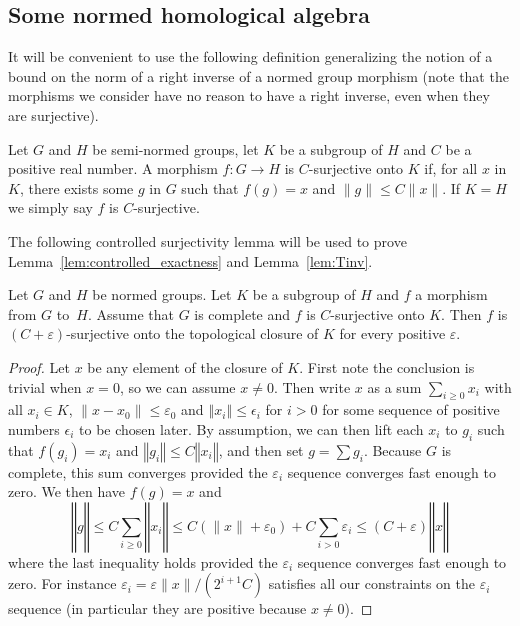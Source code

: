 \subsection{Some normed homological algebra}%
\label{sec:some_normed_homological_algebra}

It will be convenient to use the following definition generalizing the notion
of a bound on the norm of a right inverse of a normed group morphism (note that
the morphisms we consider have no reason to have a right inverse, even when
they are surjective).

\begin{definition}
  \label{def:surjective_with_bound}
  \leanok
  Let $G$ and $H$ be semi-normed groups, let $K$ be a subgroup of $H$ and $C$ be
  a positive real number.
  A morphism $f : G → H$ is $C$-surjective onto $K$ if, for all $x$ in $K$,
  there exists some $g$ in $G$ such that $f(g) = x$ and $\|g\| ≤ C\|x\|$.
  If $K = H$ we simply say $f$ is $C$-surjective.
\end{definition}

The following controlled surjectivity lemma will be used to prove
Lemma~\ref{lem:controlled_exactness} and Lemma~\ref{lem:Tinv}.

\begin{lemma}
  \label{lem:closure_surjective}
  \leanok
  Let $G$ and $H$ be normed groups.
  Let $K$ be a subgroup of $H$ and $f$ a morphism from $G$ to~$H$.
  Assume that $G$ is complete and $f$ is $C$-surjective onto $K$.
  Then $f$ is $(C + ε)$-surjective onto
  the topological closure of $K$ for every positive $ε$.
\end{lemma}

\begin{proof}\leanok
  Let $x$ be any element of the closure of $K$.
  First note the conclusion is trivial when $x = 0$, so we can assume
  $x ≠ 0$. Then write $x$ as a sum
  $\sum_{i \ge 0} x_i$ with all $x_i \in K$, $\|x - x_0\| ≤ ε_0$ and
  $‖x_i‖\leq \epsilon_i$ for $i>0$ for some sequence of positive numbers
  $\epsilon_i$ to be chosen later.
  By assumption, we can then lift each $x_i$ to $g_i$ such that
  $f(g_i) = x_i$ and $‖g_i‖\leq C‖x_i‖$, and then set
  $g = \sum g_i$. Because $G$ is complete,
  this sum converges provided the $ε_i$ sequence converges fast enough to zero.
  We then have $f(g) = x$ and
  \[
    ‖g‖ ≤ C\sum_{i \geq 0} ‖x_i‖ ≤
    C(\|x\| + ε_0) + C\sum_{i>0} ε_i ≤
    (C + ε)‖x‖
  \]
  where the last inequality holds provided the $ε_i$ sequence converges fast
  enough to zero. For instance $ε_i = ε∥x∥/(2^{i+1}C)$ satisfies all
  our constraints on the $ε_i$ sequence (in particular they are positive
  because $x ≠ 0$).
\end{proof}

